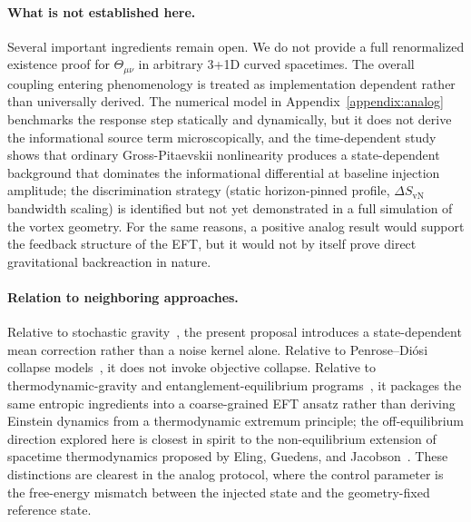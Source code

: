 \documentclass[aps,prd,twocolumn,superscriptaddress,nofootinbib,floatfix]{revtex4-2}
\newcommand{\Tmn}{\Theta_{\mu\nu}}
\begin{document}
\paragraph{What is not established here.}
Several important ingredients remain open. We do not provide a full renormalized existence proof for $\Tmn$ in arbitrary 3+1D curved spacetimes. The overall coupling entering phenomenology is treated as implementation dependent rather than universally derived. The numerical model in Appendix~\ref{appendix:analog} benchmarks the response step statically and dynamically, but it does not derive the informational source term microscopically, and the time-dependent study shows that ordinary Gross-Pitaevskii nonlinearity produces a state-dependent background that dominates the informational differential at baseline injection amplitude; the discrimination strategy (static horizon-pinned profile, $\Delta S_{\mathrm{vN}}$ bandwidth scaling) is identified but not yet demonstrated in a full simulation of the vortex geometry. For the same reasons, a positive analog result would support the feedback structure of the EFT, but it would not by itself prove direct gravitational backreaction in nature.

\paragraph{Relation to neighboring approaches.}
Relative to stochastic gravity~\cite{HuVerdaguer2008}, the present proposal introduces a state-dependent mean correction rather than a noise kernel alone. Relative to Penrose--Di\'{o}si collapse models~\cite{Penrose1996,Diosi1989}, it does not invoke objective collapse. Relative to thermodynamic-gravity and entanglement-equilibrium programs~\cite{Jacobson1995,Verlinde2011,Casini2008,Casini2011,FaulknerLewkowyczMaldacena2013}, it packages the same entropic ingredients into a coarse-grained EFT ansatz rather than deriving Einstein dynamics from a thermodynamic extremum principle; the off-equilibrium direction explored here is closest in spirit to the non-equilibrium extension of spacetime thermodynamics proposed by Eling, Guedens, and Jacobson~\cite{ElingGuedensJacobson2006}. These distinctions are clearest in the analog protocol, where the control parameter is the free-energy mismatch between the injected state and the geometry-fixed reference state.
\end{document}
